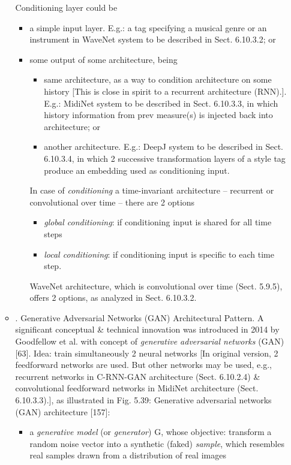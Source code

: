 \documentclass{article}
\begin{document}
\begin{itemize}
\begin{itemize}
		Conditioning layer could be
		\begin{itemize}
			\item a simple input layer. E.g.: a tag specifying a musical genre or an instrument in WaveNet system to be described in Sect. 6.10.3.2; or
			\item some output of some architecture, being
			\begin{itemize}
				\item same architecture, as a way to condition architecture on some history [This is close in spirit to a recurrent architecture (RNN).]. E.g.: MidiNet system to be described in Sect. 6.10.3.3, in which history information from prev measure(s) is injected back into architecture; or
				\item another architecture. E.g.: DeepJ system to be described in Sect. 6.10.3.4, in which 2 successive transformation layers of a style tag produce an embedding used as conditioning input.
			\end{itemize}
			In case of {\it conditioning} a time-invariant architecture -- recurrent or convolutional over time -- there are 2 options
			\begin{itemize}
				\item {\it global conditioning}: if conditioning input is shared for all time steps
				\item {\it local conditioning}: if conditioning input is specific to each time step.
			\end{itemize}
			WaveNet architecture, which is convolutional over time (Sect. 5.9.5), offers 2 options, as analyzed in Sect. 6.10.3.2.
		\end{itemize}
		\item {. Generative Adversarial Networks (GAN) Architectural Pattern.} A significant conceptual \& technical innovation was introduced in 2014 by Goodfellow et al. with concept of {\it generative adversarial networks} (GAN) [63]. Idea: train simultaneously 2 neural networks [In original version, 2 feedforward networks are used. But other networks may be used, e.g., recurrent networks in C-RNN-GAN architecture (Sect. 6.10.2.4) \& convolutional feedforward networks in MidiNet architecture (Sect. 6.10.3.3).], as illustrated in {\sf Fig. 5.39: Generative adversarial networks (GAN) architecture [157]}:
		\begin{itemize}
			\item a {\it generative model} (or {\it generator}) G, whose objective: transform a random noise vector into a synthetic (faked) {\it sample}, which resembles real samples drawn from a distribution of real images

\end{itemize}
\end{itemize}
\end{itemize}
\end{document}
